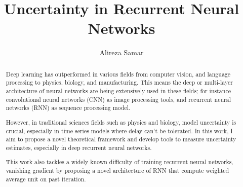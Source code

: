 \documentclass{utmthesis}
\begin{document}
\title{Uncertainty in Recurrent Neural Networks}
\author{Alireza Samar}



\maketitle



\begin{abstract}
Deep learning has outperformed in various fields from computer vision, and language processing to physics, biology, and manufacturing. This means the deep or multi-layer architecture of neural networks are being extensively used in these fields; for instance convolutional neural networks (CNN) as image processing tools, and recurrent neural networks (RNN) as sequence processing model.

However, in traditional sciences fields such as physics and biology, model uncertainty is crucial, especially in time series models where delay can’t be tolerated. In this work, I aim to propose a novel theoretical framework and develop tools to measure uncertainty estimates, especially in deep recurrent neural networks.

This work also tackles a widely known difficulty of training recurrent neural networks, vanishing gradient by proposing a novel architecture of RNN that compute weighted average unit on past iteration.

\end{abstract}
\end{document}
